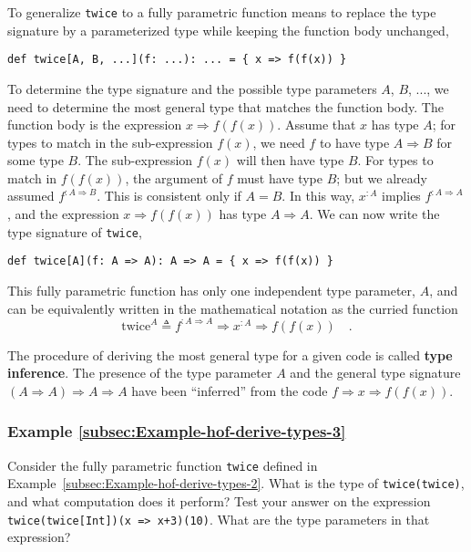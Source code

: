 To generalize \lstinline!twice!
to a fully parametric function means to replace the type signature
by a parameterized type while keeping the function body unchanged,
\begin{lstlisting}
def twice[A, B, ...](f: ...): ... = { x => f(f(x)) }
\end{lstlisting}
 To determine the type signature and the possible type parameters
$A$, $B$, ..., we need to determine the most general type that matches
the function body. The function body is the expression $x\Rightarrow f(f(x))$.
Assume that $x$ has type $A$; for types to match in the sub-expression
$f(x)$, we need $f$ to have type $A\Rightarrow B$ for some type
$B$. The sub-expression $f(x)$ will then have type $B$. For types
to match in $f(f(x))$, the argument of $f$ must have type $B$;
but we already assumed $f^{:A\Rightarrow B}$. This is consistent
only if $A=B$. In this way, $x^{:A}$ implies $f^{:A\Rightarrow A}$,
and the expression $x\Rightarrow f(f(x))$ has type $A\Rightarrow A$.
We can now write the type signature of \lstinline!twice!,
\begin{lstlisting}
def twice[A](f: A => A): A => A = { x => f(f(x)) }
\end{lstlisting}
This fully parametric function has only one independent type parameter,
$A$, and can be equivalently written in the mathematical notation
as the curried function
\begin{equation}
\text{twice}^{A}\triangleq f^{:A\Rightarrow A}\Rightarrow x^{:A}\Rightarrow f(f(x))\quad.\label{eq:hof-def-of-twice-in-math-notation}
\end{equation}

The procedure of deriving the most general type for a given code is
called \textbf{type inference}. The presence
of the type parameter $A$ and the general type signature $\left(A\Rightarrow A\right)\Rightarrow A\Rightarrow A$
have been ``inferred'' from the code $f\Rightarrow x\Rightarrow f(f(x))$.

\subsubsection{Example \label{subsec:Example-hof-derive-types-3}\ref{subsec:Example-hof-derive-types-3}}

Consider the fully parametric function \lstinline!twice!
defined in Example~\ref{subsec:Example-hof-derive-types-2}. What
is the type of \lstinline!twice(twice)!,
and what computation does it perform? Test your answer on the expression
\lstinline!twice(twice[Int])(x => x+3)(10)!.
What are the type parameters in that expression?

